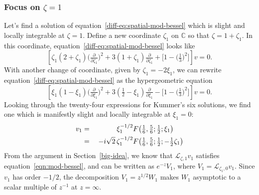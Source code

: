 \documentclass{article}
\theoremstyle{plain}
\newcommand{\C}{\mathbb{C}}
\newcommand{\laplace}{\mathcal{L}}
\begin{document}
\subsubsection{Focus on $\zeta = 1$}\label{pos-root}
Let's find a solution of equation~\ref{diff-eq:spatial-mod-bessel} which is slight and locally integrable at $\zeta = 1$. Define a new coordinate $\zeta_1$ on $\C$ so that $\zeta = 1 + \zeta_1$. In this coordinate, equation~\ref{diff-eq:spatial-mod-bessel} looks like
\begin{equation}%
\left[\zeta_1(2 + \zeta_1) \big(\tfrac{\partial}{\partial \zeta_1}\big)^2 + 3(1 + \zeta_1) \tfrac{\partial}{\partial \zeta_1} + \big[1 - \big(\tfrac{1}{3}\big)^2\big]\right] v = 0.
\end{equation}
With another change of coordinate, given by $\zeta_1 = -2\xi_1$, we can rewrite equation~\ref{diff-eq:spatial-mod-bessel} as the hypergeometric equation
\begin{equation}\label{diff-eq:hypergeom-pos}
\left[\xi_1 (1 - \xi_1) \big(\tfrac{\partial}{\partial \xi_1}\big)^2 + 3(\tfrac{1}{2} - \xi_1) \tfrac{\partial}{\partial \xi_1} - \big[1 - \big(\tfrac{1}{3}\big)^2\big]\right] v = 0.
\end{equation}
Looking through the twenty-four expressions for Kummer's six solutions, we find one \cite[formula~15.10.12]{dlmf} which is manifestly slight and locally integrable at $\xi_1 = 0$:
\begin{alignat*}{2}
v_1 &=\;& \hphantom{-i\sqrt{2}}\,\xi_1^{-1/2} & F\big(\tfrac{1}{6}, \tfrac{5}{6}; \tfrac{1}{2}; \xi_1\big) \\
&=\;& -i\sqrt{2}\,\zeta_1^{-1/2} & F\big(\tfrac{1}{6}, \tfrac{5}{6}; \tfrac{1}{2}; -\tfrac{1}{2}\zeta_1\big)
\end{alignat*}
From the argument in Section~\ref{big-idea}, we know that $\laplace_{\zeta, 1} v_1$ satisfies equation~\ref{eqn:mod-bessel}, and can be written as $e^{-z} V_1$, where $V_1 = \laplace_{\zeta_1, 0} v_1$. Since $v_1$ has order $-1/2$, the decomposition $V_1 = z^{1/2} W_1$ makes $W_1$ asymptotic to a scalar multiple of $z^{-1}$ at $z = \infty$.
\end{document}
